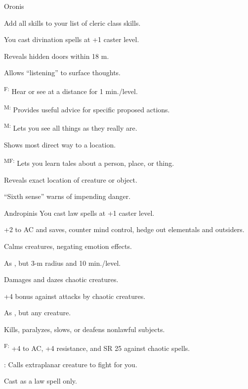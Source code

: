 {Oronis}
{Add all  skills to your list of cleric class skills.

You cast divination spells at +1 caster level.}
{
	\item {} Reveals hidden doors within 18 m.
	\item {} Allows ``listening'' to surface thoughts.
	\item {}\textsuperscript{F:} Hear or see at a distance for 1 min./level.
	\item {}\textsuperscript{M:} Provides useful advice for specific proposed actions.
	\item {}\textsuperscript{M:} Lets you see all things as they really are.
	\item {} Shows most direct way to a location.
	\item {}\textsuperscript{MF:} Lets you learn tales about a person, place, or thing.
	\item {} Reveals exact location of creature or object.
	\item {} ``Sixth sense'' warns of impending danger.
}

{Andropinis}
{You cast law spells at +1 caster level.}
{
	\item {} +2 to AC and saves, counter mind control, hedge out elementals and outsiders.
	\item {} Calms creatures, negating emotion effects.
	\item {} As , but 3-m radius and 10 min./level.
	\item {} Damages and dazes chaotic creatures.
	\item {} +4 bonus against attacks by chaotic creatures.
	\item {} As , but any creature.
	\item {} Kills, paralyzes, slows, or deafens nonlawful subjects.
	\item {}\textsuperscript{F:} +4 to AC, +4 resistance, and SR 25 against chaotic spells.
	\item {}\footnotemark[1]: Calls extraplanar creature to fight for you.
}
 Cast as a law spell only.

